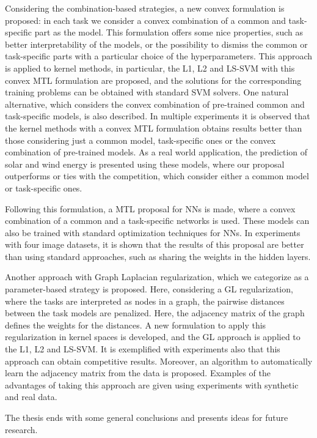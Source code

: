 \documentclass[a4paper, 11pt]{Thesis}  %
\begin{document}
{{Considering the combination-based strategies, a new convex formulation is proposed: in each task we consider a convex combination of a common and task-specific part as the model. This formulation offers some nice properties, such as better interpretability of the models, or the possibility to dismiss the common or task-specific parts with a particular choice of the hyperparameters.
This approach is applied to kernel methods, in particular, the L1, L2 and LS-SVM with this convex MTL formulation are proposed, and the solutions for the corresponding training problems can be obtained with standard SVM solvers.
One natural alternative, which considers the convex combination of pre-trained common and task-specific models, is also described.
In multiple experiments it is observed that the kernel methods with a convex MTL formulation obtains results better than those considering just a common model, task-specific ones or the convex combination of pre-trained models.
As a real world application, the prediction of solar and wind energy is presented using these models, where our proposal outperforms or ties with the competition, which consider either a common model or task-specific ones.

%
Following this formulation, a MTL proposal for NNs is made, where a convex combination of a common and a task-specific networks is used. These models can also be trained with standard optimization techniques for NNs.
In experiments with four image datasets, it is shown that the results of this proposal are better than using standard approaches, such as sharing the weights in the hidden layers.


Another approach with Graph Laplacian regularization, which we categorize as a parameter-based strategy is proposed. Here, considering a GL regularization, where the tasks are interpreted as nodes in a graph, the pairwise distances between the task models are penalized. Here, the adjacency matrix of the graph defines the weights for the distances. A new formulation to apply this regularization in kernel spaces is developed, and the GL approach is applied to the L1, L2 and LS-SVM. 
It is exemplified with experiments also that this approach can obtain competitive results. 
%
Moreover, an algorithm to automatically learn the adjacency matrix from the data is proposed. Examples of the advantages of taking this approach are given using experiments with synthetic and real data.

The thesis ends with some general conclusions and presents ideas for future research. 
%
}

}
\end{document}
